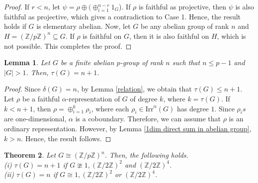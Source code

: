 \documentclass[a4paper,11pt]{amsart}
\numberwithin{equation}{section}
\numberwithin{equation}{subsection}
\newtheorem{theorem}{Theorem}[section]
\newtheorem{lemma}[theorem]{Lemma}
\newcommand{\Z}{\mathbb{Z}}
\newcommand{\irr}{\mathrm{Irr}}
\newcommand{\poonam}[1]{{\color{blue} #1}}
\begin{document}
\begin{proof}
	If $r<n$, let $\psi= \rho \oplus (\oplus_{i=1}^{n-r} 1_G$). If $\rho$ is faithful as projective, then $\psi$ is also faithful as projective, which gives a contradiction to Case 1. Hence, the result holds if $G$ is elementary abelian. 
	Now, let $G$ be any abelian group of rank $n$ and $H= (\Z/p\Z)^n \subseteq G$. If $\rho$ is faithful on $G$, then it is also faithful on $H$, which is not possible. This completes the proof.
	
\end{proof}

\begin{lemma} \label{abelian group of small rank}
	Let $G$ be a finite abelian $p$-group of rank $n$ such that $n \le p-1$ and $|G|>1$. Then, $\tau(G)= n+1$.    
\end{lemma} 

\begin{proof}
	Since $\delta(G)=n$, by Lemma \ref{relation}, we obtain that $\tau(G) \le n+1$. 
	Let $\rho$ be a faithful $\alpha$-representation of $G$ of degree $k$, where $k =\tau(G)$. 
	If $k< n+1$, then $\rho = \oplus_{i=1}^k\rho_i$, where each $\rho_i \in \irr^\alpha(G)$ has degree $1$. Since $\rho_is$ are one-dimensional, $\alpha$ is a coboundary. Therefore, we can assume that $\rho$ is an ordinary representation. %
	However, by Lemma \ref{1dim direct sum in abelian group}, $k> n$. Hence, the result follows.
\end{proof}
\begin{theorem} \label{elementary abelian p-group}
	Let $G \cong (\mathbb Z/p\Z)^{n}$. Then, the following holds. \\
	(i) $\tau(G) = n+1$ if $G \ncong 1, (\Z/2\Z)^2$ and $(\Z/2\Z)^4$.  \\
	(ii) $\tau(G)= n$ if $G \cong 1, (\Z/2\Z)^2$ or $ (\Z/2\Z)^4$.
\end{theorem}
\end{document}
